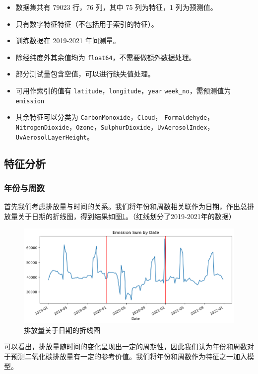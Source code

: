 \documentclass{ctexart}
\begin{document}
\begin{sloppypar}
\begin{itemize}
      \item 数据集共有 79023 行，76 列，其中 75 列为特征，1 列为预测值。
      \item 只有数字特征特征（不包括用于索引的特征）。
      \item 训练数据在 2019-2021 年间测量。%
      \item 除经纬度外其余值均为 \texttt{float64}，不需要做额外数据处理。
      \item 部分测试量包含空值，可以进行缺失值处理。
      \item 可用作索引的值有 \texttt{latitude}，\texttt{longitude}，\texttt{year} \texttt{week\_no}，需预测值为 \texttt{emission}
      \item 其余特征可以分类为 \texttt{CarbonMonoxide}，\texttt{Cloud}， \texttt{Formaldehyde}，\texttt{NitrogenDioxide}，\texttt{Ozone}，\texttt{SulphurDioxide}，\texttt{UvAerosolIndex}，\texttt{UvAerosolLayerHeight}。
\end{itemize}

\subsection{特征分析}

\subsubsection{年份与周数}

首先我们考虑排放量与时间的关系。我们将年份和周数相关联作为日期，作出总排放量关于日期的折线图，得到结果如图\ref{fig:2}。（红线划分了2019-2021年的数据）

\begin{figure}[H]
      \centering
      \includegraphics[width=1\textwidth]{output2.png}
      \caption{\label{fig:2}排放量关于日期的折线图}
\end{figure}

可以看出，排放量随时间的变化呈现出一定的周期性，因此我们认为年份和周数对于预测二氧化碳排放量有一定的参考价值。我们将年份和周数作为特征之一加入模型。


\end{sloppypar}
\end{document}
